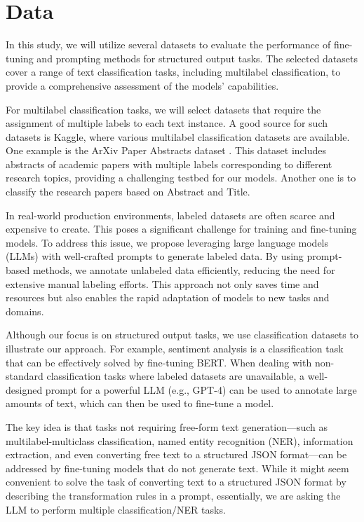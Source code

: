 \documentclass[11pt]{article}
\begin{document}
\section{Data}

In this study, we will utilize several datasets to evaluate the performance of fine-tuning and prompting methods for structured output tasks. The selected datasets cover a range of text classification tasks, including multilabel classification, to provide a comprehensive assessment of the models’ capabilities.

For multilabel classification tasks, we will select datasets that require the assignment of multiple labels to each text instance. A good source for such datasets is Kaggle, where various multilabel classification datasets are available. One example is the ArXiv Paper Abstracts dataset \cite{kaggle}. This dataset includes abstracts of academic papers with multiple labels corresponding to different research topics, providing a challenging testbed for our models. Another one is \cite{kaggle2} to classify the research papers based on Abstract and Title.

In real-world production environments, labeled datasets are often scarce and expensive to create. This poses a significant challenge for training and fine-tuning models. To address this issue, we propose leveraging large language models (LLMs) with well-crafted prompts to generate labeled data. By using prompt-based methods, we annotate unlabeled data efficiently, reducing the need for extensive manual labeling efforts. This approach not only saves time and resources but also enables the rapid adaptation of models to new tasks and domains.

Although our focus is on structured output tasks, we use classification datasets to illustrate our approach. For example, sentiment analysis is a classification task that can be effectively solved by fine-tuning BERT. When dealing with non-standard classification tasks where labeled datasets are unavailable, a well-designed prompt for a powerful LLM (e.g., GPT-4) can be used to annotate large amounts of text, which can then be used to fine-tune a model.

The key idea is that tasks not requiring free-form text generation—such as multilabel-multiclass classification, named entity recognition (NER), information extraction, and even converting free text to a structured JSON format—can be addressed by fine-tuning models that do not generate text. While it might seem convenient to solve the task of converting text to a structured JSON format by describing the transformation rules in a prompt, essentially, we are asking the LLM to perform multiple classification/NER tasks.
\end{document}

